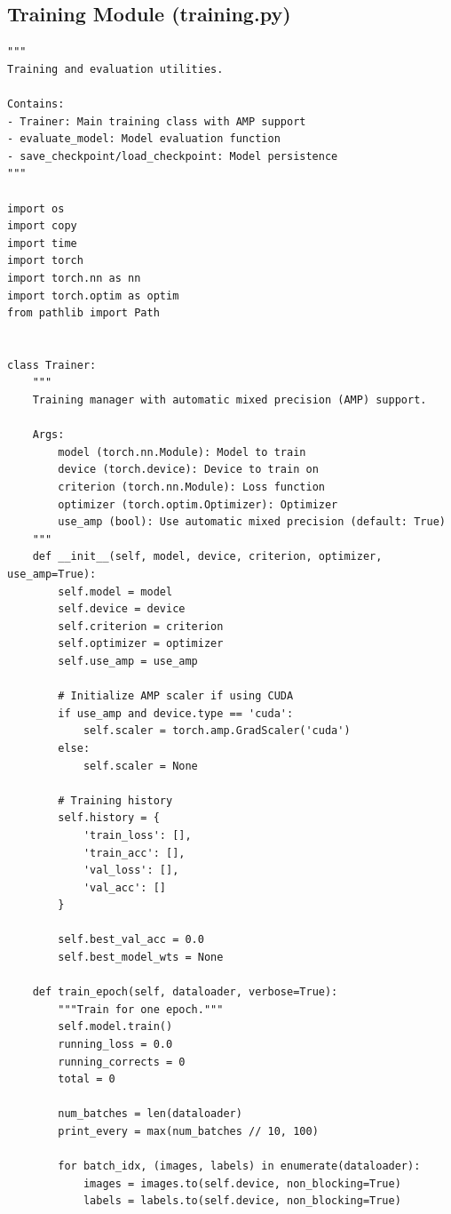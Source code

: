 \documentclass[man,12pt,letterpaper,donotrepeattitle,floatsintext]{apa7}
\begin{document}
\subsection{Training Module (training.py)}

\begin{lstlisting}[style=pythonstyle]
"""
Training and evaluation utilities.

Contains:
- Trainer: Main training class with AMP support
- evaluate_model: Model evaluation function
- save_checkpoint/load_checkpoint: Model persistence
"""

import os
import copy
import time
import torch
import torch.nn as nn
import torch.optim as optim
from pathlib import Path


class Trainer:
    """
    Training manager with automatic mixed precision (AMP) support.
    
    Args:
        model (torch.nn.Module): Model to train
        device (torch.device): Device to train on
        criterion (torch.nn.Module): Loss function
        optimizer (torch.optim.Optimizer): Optimizer
        use_amp (bool): Use automatic mixed precision (default: True)
    """
    def __init__(self, model, device, criterion, optimizer, use_amp=True):
        self.model = model
        self.device = device
        self.criterion = criterion
        self.optimizer = optimizer
        self.use_amp = use_amp
        
        # Initialize AMP scaler if using CUDA
        if use_amp and device.type == 'cuda':
            self.scaler = torch.amp.GradScaler('cuda')
        else:
            self.scaler = None
        
        # Training history
        self.history = {
            'train_loss': [],
            'train_acc': [],
            'val_loss': [],
            'val_acc': []
        }
        
        self.best_val_acc = 0.0
        self.best_model_wts = None
    
    def train_epoch(self, dataloader, verbose=True):
        """Train for one epoch."""
        self.model.train()
        running_loss = 0.0
        running_corrects = 0
        total = 0
        
        num_batches = len(dataloader)
        print_every = max(num_batches // 10, 100)
        
        for batch_idx, (images, labels) in enumerate(dataloader):
            images = images.to(self.device, non_blocking=True)
            labels = labels.to(self.device, non_blocking=True)
            

\end{lstlisting}
\end{document}
